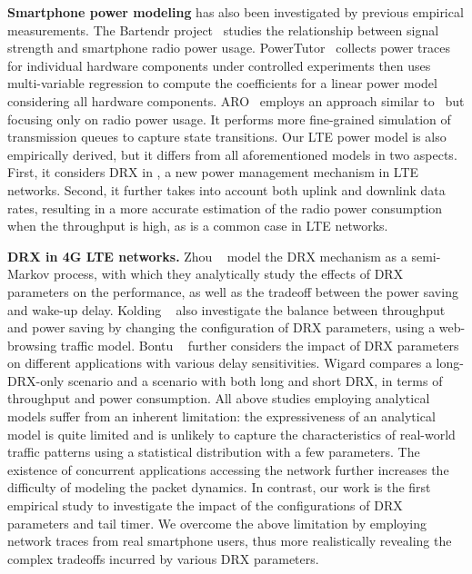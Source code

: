 \textbf{Smartphone power modeling} has also been investigated by previous empirical measurements. The Bartendr project~\cite{mobicom.bartendr} studies the relationship between signal strength and smartphone radio power usage. PowerTutor~\cite{codes.powertutor} collects power traces for individual hardware components under controlled experiments then uses multi-variable regression to compute the coefficients for a linear power model considering all hardware components. ARO~\cite{mobisys.aro} employs an approach similar to~\cite{codes.powertutor} but focusing only on radio power usage. It performs more fine-grained simulation of transmission queues to capture state transitions. Our LTE power model is also empirically derived, but it differs from all aforementioned models in two aspects. First, it considers DRX in \RC, a new power management mechanism in LTE networks. Second, it further takes into account both uplink and downlink data rates, resulting in a more accurate estimation of the radio power consumption when the throughput is high, as is a common case in LTE networks.

\textbf{DRX in 4G LTE networks.} Zhou \etal~\cite{vtc.drx} model the DRX mechanism as a semi-Markov process, with which they analytically study the effects of DRX parameters on the performance, as well as the tradeoff between the power saving and wake-up delay. Kolding \etal~\cite{iswcs.lte} also investigate the balance between throughput and power saving by changing the configuration of DRX parameters, using a web-browsing traffic model. Bontu \etal~\cite{ieee.drx} further considers the impact of DRX parameters on different applications with various delay sensitivities. Wigard \etal compares a long-DRX-only scenario and a scenario with both long and short DRX, in terms of throughput and power consumption. All above studies employing analytical models suffer from an inherent limitation: the expressiveness of an analytical model is quite limited and is unlikely to capture the characteristics of real-world traffic patterns using a statistical distribution with a few parameters. The existence of concurrent applications accessing the network further increases the difficulty of modeling the packet dynamics. In contrast, our work is the first empirical study to investigate the impact of the configurations of DRX parameters and tail timer. We overcome the above limitation by employing network traces from real smartphone users, thus more realistically revealing the complex tradeoffs incurred by various DRX parameters.



